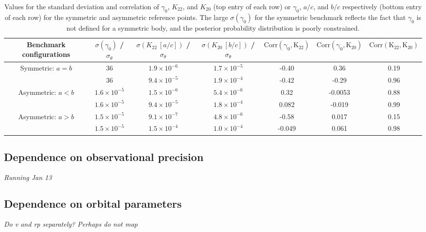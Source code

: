 \documentclass{aastex631}
\newcommand{\jtd}[1]{{\color{red}\textit{#1}}}
\begin{document}
\begin{table}
  \centering
  \begin{tabular}{c c c c c c c}
    \hline \hline
    Benchmark configurations & $\sigma(\gamma_0)$ / $\sigma_\theta$ & $\sigma(K_{22}\ [a/c])$ / $\sigma_\theta$ & $\sigma(K_{20}\ [b/c])$ / $\sigma_\theta$ & $\mathrm{Corr(\gamma_0, K_{22})}$ & $\mathrm{Corr(\gamma_0, K_{20})}$ & $\mathrm{Corr(K_{22}, K_{20})}$ \\ \hline
    Symmetric: $a=b$ & 36 & $1.9 \times 10^{-6}$ & $1.7 \times 10^{-5}$ & -0.40 & 0.36 & 0.19\\%
    & 36 & $9.4\times 10^{-5}$ & $1.9\times 10^{-4}$ & -0.42 & -0.29 & 0.96 \\
    Asymmetric: $a<b$ & $1.6 \times 10^{-5}$ & $1.5 \times 10^{-6}$ & $5.4 \times 10^{-6}$ & 0.32 & -0.0053 & 0.88\\%
    & $1.6\times 10^{-5}$ & $9.4\times 10^{-5}$ & $1.8\times 10^{-4}$ & 0.082 & -0.019 & 0.99\\
    Asymmetric: $a>b$  & $1.5 \times 10^{-5}$ & $9.1 \times 10^{-7}$ & $4.8 \times 10^{-6}$ & -0.58 & 0.017 & 0.15 \\%
    & $1.5\times 10^{-5}$ & $1.5\times 10^{-4}$ & $1.0\times 10^{-4}$ & -0.049 & 0.061 & 0.98\\
  \end{tabular}
  \caption{Values for the standard deviation and correlation of $\gamma_0$, $K_{22}$, and $K_{20}$ (top entry of each row) or $\gamma_0$, $a/c$, and $b/c$ respectively (bottom entry of each row) for the symmetric and asymmetric reference points. The large $\sigma(\gamma_0)$ for the symmetric benchmark reflects the fact that $\gamma_0$ is not defined for a symmetric body, and the posterior probability distribution is poorly constrained.}
  \label{tab:probe-space-refernece-var-covar}
\end{table}


\subsection{Dependence on observational precision}
\label{sec:probe-sigma}

\jtd{Running Jan 13}

\subsection{Dependence on orbital parameters}

\jtd{Do v and rp separately? Perhaps do not map}
\end{document}
